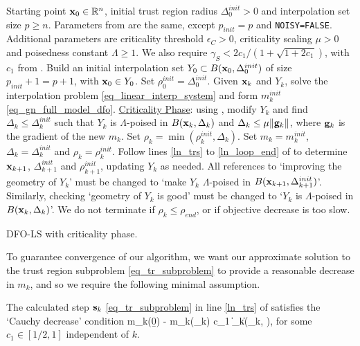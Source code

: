 \begin{algorithm}
	\small{
	\begin{algorithmic}[1]
		\Require Starting point $\mathbf{x}_0\in\mathbb{R}^n$, initial trust region radius $\Delta_0^{init}>0$ and interpolation set size $p\geq n$. 
		\Statex Parameters from  are the same, except $p_{init}=p$ and \texttt{NOISY=FALSE}.
		Additional parameters are criticality threshold $\epsilon_C>0$, criticality scaling $\mu>0$ and poisedness constant $\Lambda\geq1$. We also require $\gamma_S < 2c_1/(1+\sqrt{1+2c_1})$, with $c_1$ from .
		\State Build an initial interpolation set $Y_0\subset B(\mathbf{x}_0,\Delta_0^{init})$ of size $p_{init}+1=p+1$, with $\mathbf{x}_0\in Y_0$. Set $\rho_0^{init}=\Delta_0^{init}$.
			\State Given $\mathbf{x}_k$ and $Y_k$, solve the interpolation problem \eqref{eq_linear_interp_system} and form $m_k^{init}$ \eqref{eq_gn_full_model_dfo}.
				\State \underline{Criticality Phase}: using \cite[Algorithm 2]{Cartis2017a}, modify $Y_k$ and find $\Delta_k\leq\Delta_k^{init}$ such that $Y_k$ is $\Lambda$-poised in $B(\mathbf{x}_k,\Delta_k)$ and $\Delta_k\leq\mu\|\mathbf{g}_k\|$, where $\mathbf{g}_k$ is the gradient of the new $m_k$. Set $\rho_k= \min(\rho_k^{init}, \Delta_k)$.
			\Else
				\State Set $m_k=m_k^{init}$, $\Delta_k=\Delta_k^{init}$ and $\rho_k=\rho_k^{init}$.
			\EndIf
			\State Follow lines \ref{ln_trs} to \ref{ln_loop_end} of  to determine $\mathbf{x}_{k+1}$, $\Delta_{k+1}^{init}$ and $\rho_{k+1}^{init}$, updating $Y_k$ as needed. 
			All references to `improving the geometry of $Y_k$' must be changed to `make $Y_k$ $\Lambda$-poised in $B(\mathbf{x}_{k+1},\Delta_{k+1}^{init})$'.
			Similarly, checking `geometry of $Y_k$ is good' must be changed to `$Y_k$ is $\Lambda$-poised in $B(\mathbf{x}_k,\Delta_k)$'.
			We do not terminate if $\rho_k \leq \rho_{end}$, or if objective decrease is too slow.
		\EndFor
	\end{algorithmic}
	} %
	\caption{DFO-LS with criticality phase.}
	\label{alg_dfols_theory}
\end{algorithm}

To guarantee convergence of our algorithm, we want our approximate solution to the trust region subproblem \eqref{eq_tr_subproblem} to provide a reasonable decrease in $m_k$, and so we require the following minimal assumption.

\begin{assumption} \label{ass_cauchy_decrease}
	The calculated step $\mathbf{s}_k$ \eqref{eq_tr_subproblem} in line \ref{ln_trs} of  satisfies the `Cauchy decrease' condition
	\be m_k(\b{0}) - m_k(\bs_k) \geq c_1 \|\bg_k\| \min\left(\Delta_k, \right), \ee
	for some $c_1\in[1/2, 1]$ independent of $k$.
\end{assumption}

